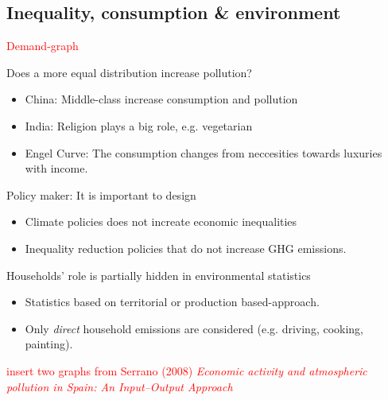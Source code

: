 \subsection{Inequality, consumption \& environment}
\textcolor{red}{Demand-graph}
\begin{multicols}{2}
 Does a more equal distribution increase pollution?
 \begin{itemize}
  \item China: Middle-class increase consumption and pollution
  \item India: Religion plays a big role, e.g. vegetarian
  \item Engel Curve: The consumption changes from neccesities towards luxuries with income.
 \end{itemize}
 Policy maker: It is important to design
 \begin{itemize}
  \item Climate policies does not increate economic inequalities
  \item Inequality reduction policies that do not increase GHG emissions.
 \end{itemize}
 Households' role is partially hidden in environmental statistics
 \begin{itemize}
  \item Statistics based on territorial or production based-approach.
  \item Only \textit{direct} household emissions are considered (e.g. driving, cooking, painting).
 \end{itemize}
 \textcolor{red}{insert two graphs from Serrano (2008) \textit{Economic activity and atmospheric pollution in Spain: An Input–Output Approach}}\\


\end{multicols}
